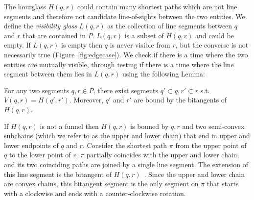 \documentclass[UKenglish]{lipics-v2019}
\begin{document}
The hourglass $H(q, r)$ could contain many shortest paths which are not line segments and therefore not candidate line-of-sights between the two entities. We define the \emph{visibility glass} $L(q,r)$ as the collection of line segments between $q$ and $r$ that are contained in $P$. $L(q,r)$ is a subset of $H(q,r)$ and could be empty. If $L(q,r)$ is empty then $q$ is never visible from $r$, but the converse is not necessarily true (Figure~\ref{fig:edgecase}). We check if there is a time where the two entities are mutually visible, through testing if there is a time where the line segment between them lies in $L(q,r)$ using the following Lemma:

\begin{lemma}
For any two segments $q, r \in P$, there exist segments $q' \subset q, r' \subset r$ s.t. $V(q, r) = H(q', r')$. Moreover, $q'$ and $r'$ are bound by the bitangents of $H(q, r)$.
\end{lemma}

If $H(q,r)$ is not a funnel then $H(q,r)$ is bouned by $q, r$ and two semi-convex subchains (which we refer to as the upper and lower chain) that end in upper and lower endpoints of $q$ and $r$. Consider the shortest path $\pi$ from the upper point of $q$ to the lower point of $r$. $\pi$ partially coincides with the upper and lower chain, and its two coinciding paths are joined by a single line segment. The extension of this line segment is the bitangent of $H(q,r)$~\cite{FRANK}. Since the upper and lower chain are convex chains, this bitangent segment is the only segment on $\pi$ that starts with a clockwise and ends with a counter-clockwise rotation. 
\end{document}
